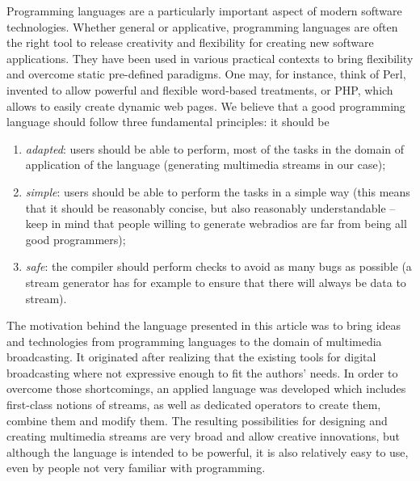\documentclass{llncs}
\begin{document}
Programming languages are a particularly important aspect of modern software
technologies.  Whether general or applicative, programming languages are often
the right tool to release creativity and flexibility for creating new software
applications.  They have been used in various practical contexts to bring
flexibility and overcome static pre-defined paradigms. One may, for instance,
think of Perl, invented to allow powerful and flexible word-based treatments, or
PHP, which allows to easily create dynamic web pages. We believe that a good
programming language should follow three fundamental principles: it should be
\begin{enumerate}
\item \emph{adapted}: users should be able to perform, most of the tasks in the
  domain of application of the language (generating multimedia streams in our
  case);
\item \emph{simple}: users should be able to perform the tasks in a simple way
  (this means that it should be reasonably concise, but also reasonably
  understandable -- keep in mind that people willing to generate webradios are
  far from being all good programmers);
\item \emph{safe}: the compiler should perform checks to avoid as many bugs as
  possible (a stream generator has for example to ensure that there will always
  be data to stream).
\end{enumerate}


The motivation behind the language presented in this article was to bring
ideas and technologies from programming languages to the domain of multimedia
broadcasting. It originated after realizing that the existing tools for digital
broadcasting where not expressive enough to fit the authors' needs. In order to
overcome those shortcomings, an applied language was developed which
includes first-class notions of streams, as well as dedicated operators to
create them, combine them and modify them. The resulting possibilities for
designing and creating multimedia streams are very broad and allow creative
innovations, but although the language is intended to be powerful, it is also
relatively easy to use, even by people not very familiar with programming.

\end{document}
